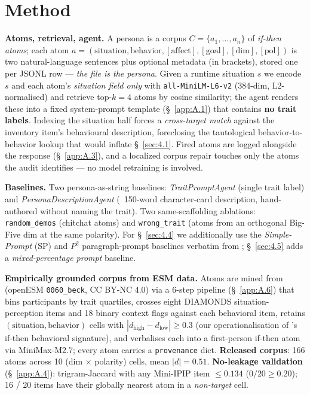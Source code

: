 \section{Method}
\label{sec:3}



\textbf{Atoms, retrieval, agent.} A persona is a corpus $C = \{a_1, \ldots, a_n\}$ of \textit{if-then atoms}; each atom $a = (\text{situation},\allowbreak  \text{behavior},\allowbreak  [\text{affect}],\allowbreak  [\text{goal}],\allowbreak  [\text{dim}],\allowbreak  [\text{pol}])$ is two natural-language sentences plus optional metadata (in brackets), stored one per JSONL row --- \textit{the file is the persona}. Given a runtime situation $s$ we encode $s$ and each atom's \textit{situation field only} with \texttt{all-\allowbreak{}MiniLM-\allowbreak{}L6-\allowbreak{}v2} \cite{sbert2019} (384-dim, L2-normalised) and retrieve top-$k = 4$ atoms by cosine similarity; the agent renders these into a fixed system-prompt template (\S~\ref{app:A.1}) that contains \textbf{no trait labels}. Indexing the situation half forces a \textit{cross-target match} against the inventory item's behavioural description, foreclosing the tautological behavior-to-behavior lookup that would inflate \S~\ref{sec:4.1}. Fired atoms are logged alongside the response (\S~\ref{app:A.3}), and a localized corpus repair touches only the atoms the audit identifies --- no model retraining is involved.

\textbf{Baselines.} Two persona-as-string baselines: \textit{TraitPromptAgent} (single trait label) and \textit{PersonaDescriptionAgent} (~150-word character-card description, hand-authored without naming the trait). Two same-scaffolding ablations: \texttt{random\_\allowbreak{}demos} (chitchat atoms) and \texttt{wrong\_\allowbreak{}trait} (atoms from an orthogonal Big-Five dim at the same polarity). For \S~\ref{sec:4.4} we additionally use the \textit{Simple-Prompt} (SP) and \textit{$P^{\!2}$} paragraph-prompt baselines verbatim from \citet{NPTI}; \S~\ref{sec:4.5} adds a \textit{mixed-percentage prompt} baseline.

\textbf{Empirically grounded corpus from ESM data.} Atoms are mined from \citet{beck2022esm} (openESM \texttt{0060\_\allowbreak{}beck}, CC BY-NC 4.0) via a 6-step pipeline (\S~\ref{app:A.6}) that bins participants by trait quartiles, crosses eight DIAMONDS situation-perception items \cite{rauthmann2014diamonds} and 18 binary context flags against each behavioral item, retains $(\text{situation}, \text{behavior})$ cells with $|d_\text{high} - d_\text{low}| \geq 0.3$ (our operationalisation of \citet{mischel1995caps}'s if-then behavioral signature), and verbalises each into a first-person if-then atom via MiniMax-M2.7; every atom carries a \texttt{provenance} dict. \textbf{Released corpus}: 166 atoms across 10 (dim $\times$ polarity) cells, mean $|d| = 0.51$. \textbf{No-leakage validation} (\S~\ref{app:A.4}): trigram-Jaccard with any Mini-IPIP item $\leq 0.134$ ($0/20 \geq 0.20$); 16 / 20 items have their globally nearest atom in a \textit{non-target} cell.

